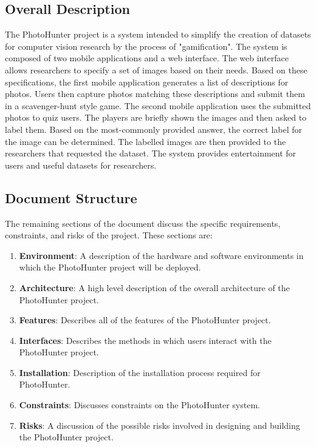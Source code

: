 \documentclass{article}
\begin{document}
\subsection{Overall Description}
The PhotoHunter project is a system intended to simplify the creation of datasets for computer vision research by the process of "gamification". The system is composed of two mobile applications and a web interface. The web interface allows researchers to specify a set of images based on their needs. Based on these specifications, the first mobile application generates a list of descriptions for photos. Users then capture photos matching these descriptions and submit them in a scavenger-hunt style game. The second mobile application uses the submitted photos to quiz users. The players are briefly shown the images and then asked to label them. Based on the most-commonly provided answer, the correct label for the image can be determined. The labelled images are then provided to the researchers that requested the dataset. The system provides entertainment for users and useful datasets for researchers.

\subsection{Document Structure}
The remaining sections of the document discuss the specific requirements, constraints, and risks of the project. These sections are:
\begin{enumerate}
\item \textbf{Environment}: A description of the hardware and software environments in which the PhotoHunter project will be deployed.
\item \textbf{Architecture}: A high level description of the overall architecture of the PhotoHunter project.
\item \textbf{Features}: Describes all of the features of the PhotoHunter project.
\item \textbf{Interfaces}: Describes the methods in which users interact with the PhotoHunter project.
\item \textbf{Installation}: Description of the installation process required for PhotoHunter.
\item \textbf{Constraints}: Discusses constraints on the PhotoHunter system.
\item \textbf{Risks}: A discussion of the possible risks involved in designing and building the PhotoHunter project.
\end{enumerate}
\end{document}
